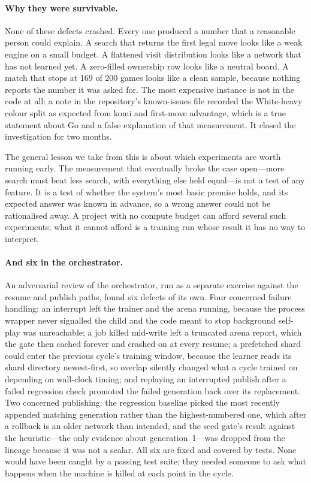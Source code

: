 \paragraph{Why they were survivable.}
None of these defects crashed. Every one produced a number that a reasonable
person could explain. A search that returns the first legal move looks like a
weak engine on a small budget. A flattened visit distribution looks like a
network that has not learned yet. A zero-filled ownership row looks like a
neutral board. A match that stops at 169 of 200 games looks like a clean sample,
because nothing reports the number it was asked for. The most expensive instance
is not in the code at all: a note in the repository's known-issues file recorded
the White-heavy colour split as expected from komi and first-move advantage,
which is a true statement about Go and a false explanation of that measurement.
It closed the investigation for two months.

The general lesson we take from this is about which experiments are worth
running early. The measurement that eventually broke the case open---more search
must beat less search, with everything else held equal---is not a test of any
feature. It is a test of whether the system's most basic premise holds, and its
expected answer was known in advance, so a wrong answer could not be rationalised
away. A project with no compute budget can afford several such experiments; what
it cannot afford is a training run whose result it has no way to interpret.

\paragraph{And six in the orchestrator.}
\label{sec:pipeline-eval-review}
An adversarial review of the orchestrator, run as a separate exercise against the
resume and publish paths, found six defects of its own. Four concerned failure
handling: an interrupt left the trainer and the arena running, because the
process wrapper never signalled the child and the code meant to stop background
self-play was unreachable; a job killed mid-write left a truncated arena report,
which the gate then cached forever and crashed on at every resume; a prefetched
shard could enter the previous cycle's training window, because the learner reads
its shard directory newest-first, so overlap silently changed what a cycle
trained on depending on wall-clock timing; and replaying an interrupted publish
after a failed regression check promoted the failed generation back over its
replacement. Two concerned publishing: the regression baseline picked the most
recently appended matching generation rather than the highest-numbered one, which
after a rollback is an older network than intended, and the seed gate's result
against the heuristic---the only evidence about generation~1---was dropped from
the lineage because it was not a scalar. All six are fixed and covered by tests.
None would have been caught by a passing test suite; they needed someone to ask
what happens when the machine is killed at each point in the cycle.

